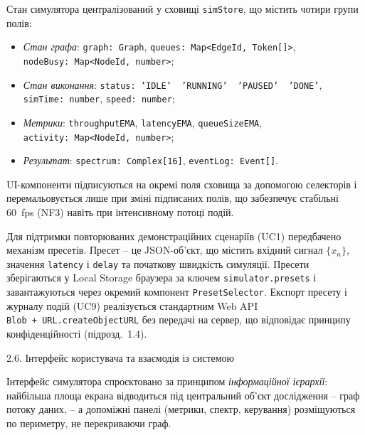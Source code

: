 \documentclass[
]{article}
\begin{document}
Стан симулятора централізований у сховищі \texttt{simStore}, що містить
чотири групи полів:

\begin{itemize}
\item
  \emph{Стан графа}: \texttt{graph}\texttt{:\ }\texttt{Graph},
  \texttt{queues}\texttt{:\ }\texttt{Map}\texttt{\textless{}}\texttt{EdgeId}\texttt{,\ }\texttt{Token}\texttt{{[}{]}\textgreater{}},
  \texttt{nodeBusy}\texttt{:\ }\texttt{Map}\texttt{\textless{}}\texttt{NodeId}\texttt{,\ }\texttt{number}\texttt{\textgreater{}};
\item
  \emph{Стан виконання}:
  \texttt{status}\texttt{:\ ’IDLE’\ \textbar{}\ ’RUNNING’\ \textbar{}\ ’PAUSED’\ \textbar{}\ ’DONE’},
  \texttt{simTime}\texttt{:\ }\texttt{number},
  \texttt{speed}\texttt{:\ }\texttt{number};
\item
  \emph{Метрики}: \texttt{throughputEMA}, \texttt{latencyEMA},
  \texttt{queueSizeEMA},
  \texttt{activity}\texttt{:\ }\texttt{Map}\texttt{\textless{}}\texttt{NodeId}\texttt{,\ }\texttt{number}\texttt{\textgreater{}};
\item
  \emph{Результат}:
  \texttt{spectrum}\texttt{:\ }\texttt{Complex}\texttt{{[}16{]}},
  \texttt{eventLog}\texttt{:\ }\texttt{Event}\texttt{{[}{]}}.
\end{itemize}

UI-компоненти підписуються на окремі поля сховища за допомогою
селекторів і перемальовується лише при зміні підписаних полів, що
забезпечує стабільні 60~fps (NF3) навіть при інтенсивному потоці подій.

Для підтримки повторюваних демонстраційних сценаріїв (UC1) передбачено
механізм пресетів. Пресет -- це JSON-об'єкт, що містить вхідний сигнал
\(\{ x_{n}\}\), значення \texttt{latency} і \texttt{delay} та початкову
швидкість симуляції. Пресети зберігаються у Local Storage браузера за
ключем \texttt{simulator.presets} і завантажуються через окремий
компонент \texttt{PresetSelector}. Експорт пресету і журналу подій (UC9)
реалізується стандартним Web API
\texttt{Blob}\texttt{\ +\ }\texttt{URL.createObjectURL} без передачі на
сервер, що відповідає принципу конфіденційності (підрозд.~1.4).

\protect{}\label{_Toc228121473}{}2.6. Інтерфейс користувача
та взаємодія із системою

Інтерфейс симулятора спроєктовано за принципом \emph{інформаційної
ієрархії}: найбільша площа екрана відводиться під центральний об'єкт
дослідження -- граф потоку даних, -- а допоміжні панелі (метрики,
спектр, керування) розміщуються по периметру, не перекриваючи граф.
\end{document}
